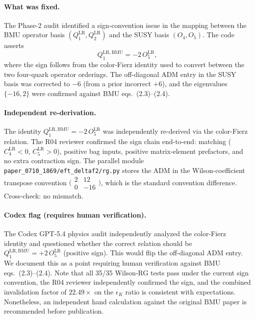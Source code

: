 \documentclass[11pt]{article}
\newcommand{\eK}{\epsilon_K}
\begin{document}
\paragraph{What was fixed.}
The Phase-2 audit identified a sign-convention issue in the mapping
between the BMU operator basis $(Q_1^{\mathrm{LR}},
Q_2^{\mathrm{LR}})$ and the SUSY basis $(O_4, O_5)$.  The code
asserts
\begin{equation}\label{eq:q1lr-map}
  Q_1^{\mathrm{LR,BMU}} = -2\,O_5^{\mathrm{LR}},
\end{equation}
where the sign follows from the color-Fierz identity used to convert
between the two four-quark operator orderings.  The off-diagonal ADM
entry in the SUSY basis was corrected to $-6$ (from a prior incorrect
$+6$), and the eigenvalues $\{-16, 2\}$ were confirmed against BMU
eqs.~(2.3)--(2.4).

\paragraph{Independent re-derivation.}
The identity $Q_1^{\mathrm{LR,BMU}} = -2\,O_5^{\mathrm{LR}}$ was
independently re-derived via the color-Fierz relation.  The R04
reviewer confirmed the sign chain end-to-end: matching
($C_4^{\mathrm{LR}} < 0$, $C_5^{\mathrm{LR}} > 0$), positive bag
inputs, positive matrix-element prefactors, and no extra contraction
sign.  The parallel module
\texttt{paper\_0710\_1869/eft\_deltaf2/rg.py} stores the ADM in the
Wilson-coefficient transpose convention
$\bigl(\begin{smallmatrix}2&12\\0&-16\end{smallmatrix}\bigr)$, which
is the standard convention difference.  Cross-check: no mismatch.

\paragraph{Codex flag (requires human verification).}
The Codex GPT-5.4 physics audit independently analyzed the
color-Fierz identity and questioned whether the correct relation
should be $Q_1^{\mathrm{LR,BMU}} = +2\,O_5^{\mathrm{LR}}$ (positive
sign).  This would flip the off-diagonal ADM entry.  We document this
as a point requiring human verification against BMU
eqs.~(2.3)--(2.4).  Note that all 35/35 Wilson-RG tests pass under
the current sign convention, the R04 reviewer independently confirmed
the sign, and the combined invalidation factor of $22.49\times$ on the
$\eK$ ratio is consistent with expectations.  Nonetheless, an
independent hand calculation against the original BMU paper is
recommended before publication.
\end{document}
